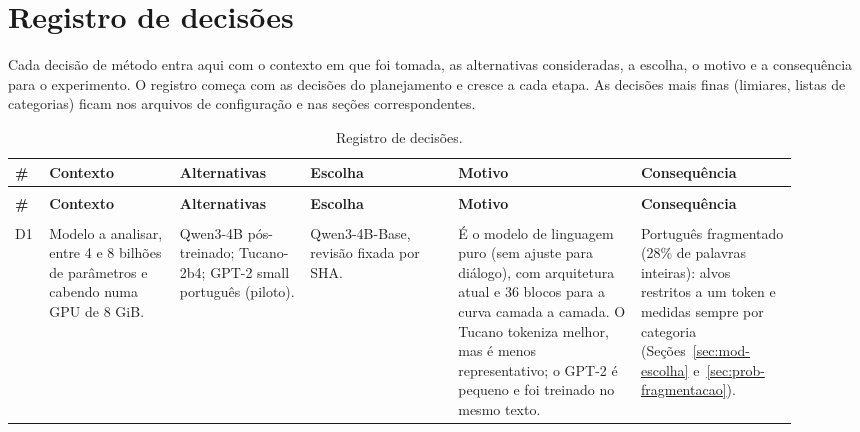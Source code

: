 
\section{Registro de decisões}\label{sec:decisoes}

Cada decisão de método entra aqui com o contexto em que foi tomada, as alternativas
consideradas, a escolha, o motivo e a consequência para o experimento. O registro começa com as
decisões do planejamento e cresce a cada etapa. As decisões mais finas (limiares, listas de
categorias) ficam nos arquivos de configuração e nas seções correspondentes.

{\footnotesize
\setlength{\tabcolsep}{3.5pt}
\renewcommand{\arraystretch}{1.15}
\begin{longtable}{@{}>{\raggedright\arraybackslash}p{0.035\linewidth}
    >{\raggedright\arraybackslash}p{0.155\linewidth}
    >{\raggedright\arraybackslash}p{0.155\linewidth}
    >{\raggedright\arraybackslash}p{0.17\linewidth}
    >{\raggedright\arraybackslash}p{0.21\linewidth}
    >{\raggedright\arraybackslash}p{0.185\linewidth}@{}}
\caption{Registro de decisões.}\label{tab:decisoes}\\
\toprule
\textbf{\#} & \textbf{Contexto} & \textbf{Alternativas} & \textbf{Escolha} & \textbf{Motivo} &
\textbf{Consequência} \\
\midrule
\endfirsthead
\multicolumn{6}{@{}l}{\emph{Tabela~\ref{tab:decisoes}, continuação}}\\
\toprule
\textbf{\#} & \textbf{Contexto} & \textbf{Alternativas} & \textbf{Escolha} & \textbf{Motivo} &
\textbf{Consequência} \\
\midrule
\endhead
\midrule
\multicolumn{6}{r@{}}{\emph{continua}}\\
\endfoot
\bottomrule
\endlastfoot
D1 & Modelo a analisar, entre 4 e 8 bilhões de parâmetros e cabendo numa GPU de 8 GiB. &
Qwen3-4B pós-treinado; Tucano-2b4; GPT-2 small português (piloto). &
Qwen3-4B-Base, revisão fixada por SHA. &
É o modelo de linguagem puro (sem ajuste para diálogo), com arquitetura atual e 36 blocos para a
curva camada a camada. O Tucano tokeniza melhor, mas é menos representativo; o GPT-2 é pequeno e
foi treinado no mesmo texto. &
Português fragmentado (28\% de palavras inteiras): alvos restritos a um token e medidas sempre
por categoria (Seções~\ref{sec:mod-escolha} e~\ref{sec:prob-fragmentacao}). \\

\end{longtable}}
